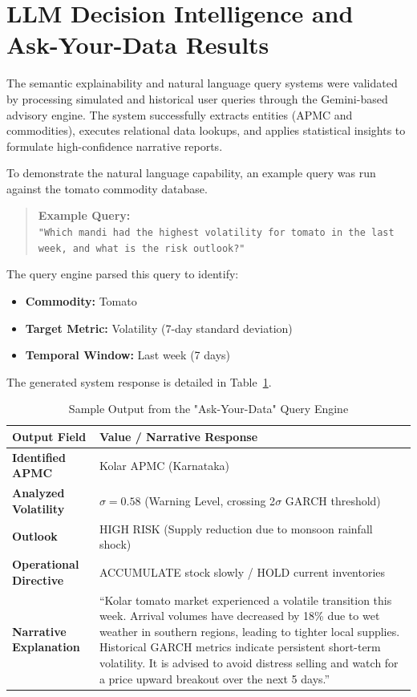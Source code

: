 \documentclass[12pt,a4paper]{report}
\begin{document}
\section{LLM Decision Intelligence and Ask-Your-Data Results}

The semantic explainability and natural language query systems were validated by processing simulated and historical user queries through the Gemini-based advisory engine. The system successfully extracts entities (APMC and commodities), executes relational data lookups, and applies statistical insights to formulate high-confidence narrative reports.

To demonstrate the natural language capability, an example query was run against the tomato commodity database.

\begin{quote}
\textbf{Example Query:} \\
\texttt{"Which mandi had the highest volatility for tomato in the last week, and what is the risk outlook?"}
\end{quote}

The query engine parsed this query to identify:
\begin{itemize}
    \item \textbf{Commodity:} Tomato
    \item \textbf{Target Metric:} Volatility (7-day standard deviation)
    \item \textbf{Temporal Window:} Last week (7 days)
\end{itemize}

The generated system response is detailed in Table~\ref{tab:query_output_example}.

\begin{table}[H]
\centering
\caption{Sample Output from the "Ask-Your-Data" Query Engine}
\label{tab:query_output_example}
\renewcommand{\arraystretch}{1.3}
\begin{tabular}{|p{4cm}|p{8cm}|}
\hline
\textbf{Output Field} & \textbf{Value / Narrative Response} \\
\hline
\textbf{Identified APMC} & Kolar APMC (Karnataka) \\
\hline
\textbf{Analyzed Volatility} & $\sigma = 0.58$ (Warning Level, crossing 2$\sigma$ GARCH threshold) \\
\hline
\textbf{Outlook} & HIGH RISK (Supply reduction due to monsoon rainfall shock) \\
\hline
\textbf{Operational Directive} & ACCUMULATE stock slowly / HOLD current inventories \\
\hline
\textbf{Narrative Explanation} & ``Kolar tomato market experienced a volatile transition this week. Arrival volumes have decreased by 18\% due to wet weather in southern regions, leading to tighter local supplies. Historical GARCH metrics indicate persistent short-term volatility. It is advised to avoid distress selling and watch for a price upward breakout over the next 5 days.'' \\
\hline
\end{tabular}
\end{table}
\end{document}

